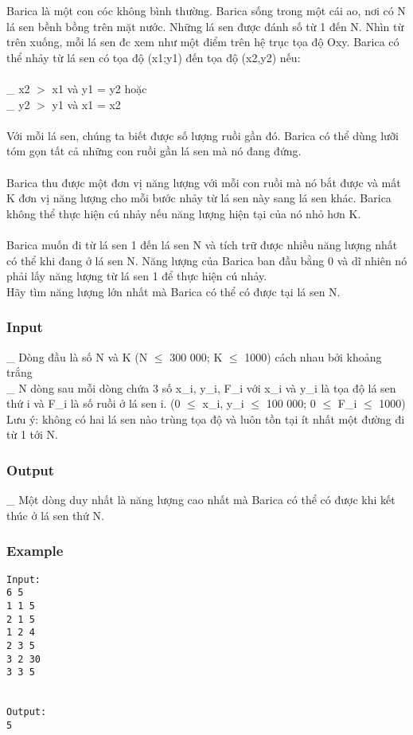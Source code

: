 



   Barica là một con cóc không bình thường. Barica sống trong một cái ao, nơi có N lá sen bềnh bồng trên mặt nước. Những lá sen được đánh số từ 1 đến N. Nhìn từ trên xuống, mỗi lá sen đc xem như một điểm trên hệ trục tọa độ Oxy. Barica có thể nhảy từ lá sen có tọa độ (x1;y1) đến tọa độ (x2,y2) nếu:   
\\
\\   \_ x2 $>$ x1 và y1 = y2 hoặc   
\\   \_ y2 $>$ y1 và x1 = x2   
\\
\\   Với mỗi  lá sen, chúng ta biết được số lượng ruồi gần đó. Barica có thể dùng lưỡi tóm gọn tất cả những con ruồi gần lá sen mà nó đang đứng.   
\\
\\   Barica thu được một đơn vị năng lượng với mỗi con ruồi mà nó bắt được và mất K đơn vị năng lượng cho mỗi bước nhảy từ lá sen này sang lá sen khác. Barica không thể thực hiện cú nhảy nếu năng lượng hiện tại của nó nhỏ hơn K.   
\\
\\   Barica muốn đi từ lá sen 1 đến lá sen N và tích trữ được nhiều năng lượng nhất có thể khi đang ở lá sen N. Năng lượng của Barica ban đầu bằng 0 và dĩ nhiên nó phải lấy năng lượng từ lá sen 1 để thực hiện cú nhảy.   
\\   Hãy tìm năng lượng lớn nhất mà Barica có thể có được tại lá sen N.  

\subsubsection{   Input  }

   \_ Dòng đầu là số N và K (N $\le$ 300 000; K $\le$ 1000) cách nhau bởi khoảng trắng   
\\   \_ N dòng sau mỗi dòng chứa 3 số x\_i, y\_i, F\_i với x\_i và y\_i là tọa độ lá sen thứ i và F\_i là số ruồi ở lá sen i.  (0  $\le$  x\_i, y\_i  $\le$  100 000; 0  $\le$  F\_i  $\le$ 1000)   
\\   Lưu ý: không có hai lá sen nào trùng tọa độ và luôn tồn tại ít nhất một đường đi từ 1 tới N.  

\subsubsection{   Output  }

   \_ Một dòng duy nhất là năng lượng cao nhất mà Barica có thể có được khi kết thúc ở lá sen thứ N.  

\subsubsection{   Example  }
\begin{verbatim}
Input:
6 5
1 1 5
2 1 5
1 2 4
2 3 5
3 2 30
3 3 5


Output:
5
\end{verbatim}
